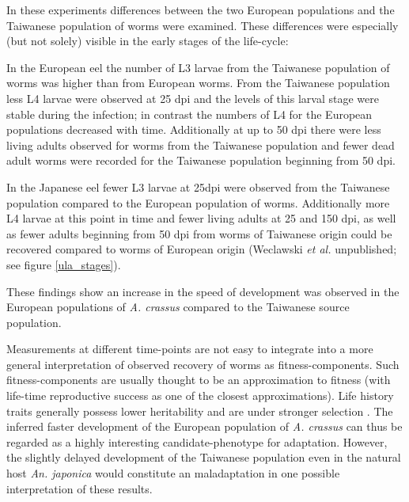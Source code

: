 In these experiments differences between the two European populations
and the Taiwanese population of worms were examined. These differences
were especially (but not solely) visible in the early stages of the
life-cycle:

In the European eel the number of L3 larvae from the Taiwanese
population of worms was higher than from European worms. From the
Taiwanese population less L4 larvae were observed at 25 dpi and the
levels of this larval stage were stable during the infection; in
contrast the numbers of L4 for the European populations decreased with
time. Additionally at up to 50 dpi there were less living adults
observed for worms from the Taiwanese population and fewer dead adult
worms were recorded for the Taiwanese population beginning from 50
dpi.

In the Japanese eel fewer L3 larvae at 25dpi were observed from the
Taiwanese population compared to the European population of
worms. Additionally more L4 larvae at this point in time and fewer
living adults at 25 and 150 dpi, as well as fewer adults beginning
from 50 dpi from worms of Taiwanese origin could be recovered compared
to worms of European origin (Weclawski \textit{et al.} unpublished;
see figure \ref{ula_stages}).

These findings show an increase in the speed of development was
observed in the European populations of \textit{A. crassus} compared
to the Taiwanese source population.

Measurements at different time-points are not easy to integrate into a
more general interpretation of observed recovery of worms as
fitness-components. Such fitness-components are usually thought to be
an approximation to fitness (with life-time reproductive success as one
of the closest approximations). Life history traits generally possess
lower heritability and are under stronger selection
\cite{pmid3316130}. The inferred faster development of the European
population of \textit{A. crassus} can thus be regarded as a highly
interesting candidate-phenotype for adaptation. However, the slightly
delayed development of the Taiwanese population even in the natural
host \textit{An. japonica} would constitute an maladaptation
\cite{pmid21708731} in one possible interpretation of these results.

